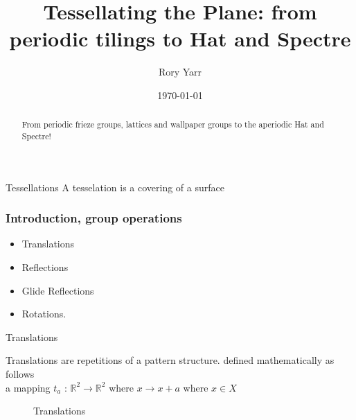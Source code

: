 \documentclass{beamer}
\title[Tilling the Plane]{Tessellating the Plane: from periodic tilings to Hat and Spectre}
\author{Rory Yarr}
\date{\today}
\theoremstyle{definition}
\begin{document}
\begin{frame}
  \titlepage

  \begin{abstract}
    From periodic frieze groups, lattices and wallpaper groups to the aperiodic Hat and Spectre!
  \end{abstract}
\end{frame}

\begin{frame}{Tessellations}
    A tesselation is a covering of a surface
\end{frame}

\begin{frame}
  \frametitle{Introduction, group operations}
  \begin{definition}
  \begin{itemize}
      \item Translations 
      \item Reflections
      \item Glide Reflections
      \item Rotations.
  \end{itemize}
  \end{definition}
\end{frame}

\begin{frame}{Translations }
\begin{definition}
     Translations are repetitions of a pattern structure.  defined mathematically as follows \\ 
    a mapping $t_a$ : $\mathbb{R}^2 \rightarrow \mathbb{R}^2$ where $x \rightarrow x + a $ where $x \in X$  \cite{Angela:2023}
\end{definition}
   \begin{figure}
        \centering
        \caption{Translations}
        \label{Reflection}
    \end{figure}
\end{frame}
\end{document}
